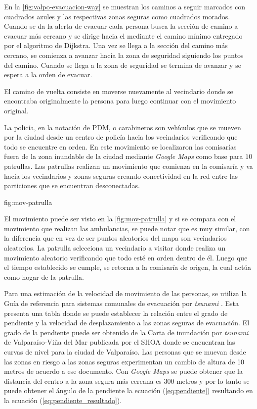 En la \ref{fig:valpo-evacuacion-way} se muestran los caminos a seguir marcados con
cuadrados azules y las respectivas zonas seguras como cuadrados morados. Cuando
se da la alerta de evacuar cada persona busca la sección de camino a evacuar más
cercano y se dirige hacia el mediante el camino mínimo entregado por el algoritmo de
Dijkstra. Una vez se llega a la sección del camino más cercano, se comienza a
avanzar hacia la zona de seguridad siguiendo los puntos del camino. Cuando se
llega a la zona de seguridad se termina de avanzar y se espera a la orden de
evacuar.

El camino de vuelta consiste en moverse nuevamente al vecindario donde se
encontraba originalmente la persona para luego continuar con el movimiento
original.





La policía, en la notación de PDM, o carabineros son vehículos que se mueven por
la ciudad desde un centro de policía hacia los vecindarios verificando que todo
se encuentre en orden. En este movimiento se localizaron las comisarías fuera de
la zona inundable de la ciudad mediante \textit{Google Maps} como base para 
$10$ patrullas. Las patrullas realizan un movimiento que comienza en la comisaría y va hacia
los vecindarios y zonas seguras creando conectividad en la red entre las
particiones que se encuentran desconectadas.




{}{fig:mov-patrulla}


El movimiento puede ser visto en la \ref{fig:mov-patrulla} y si se compara con
el movimiento que realizan las ambulancias, se puede notar que es muy similar,
con la diferencia que en vez de ser puntos aleatorios del mapa son vecindarios
aleatorios. La patrulla selecciona un vecindario a visitar donde realiza un
movimiento aleatorio verificando que todo esté en orden dentro de él. Luego que
el tiempo establecido se cumple, se retorna a la comisaría de origen, la cual
actúa como hogar de la patrulla.



Para una estimación de la velocidad de movimiento de las personas, se utiliza la
Guía de referencia para sistemas comunales de evacuación por \textit{tsunami}
\cite{guia_referencia_onemi}. Esta presenta una tabla donde se puede establecer la
relación entre el grado de pendiente y la velocidad de desplazamiento a las
zonas seguras de evacuación. El grado de la pendiente puede ser obtenido de la
Carta de inundación por \textit{tsunami} de Valparaíso-Viña del Mar
\cite{curvas_nivel} publicada por el SHOA donde se encuentran las curvas de nivel
para la ciudad de Valparaíso. Las personas que se muevan desde las zonas en
riesgo a las zonas seguras experimentan un cambio de altura de 10 metros de
acuerdo a ese documento. Con \textit{Google Maps} se puede obtener que la
distancia del centro a la zona segura más cercana es $300$ metros y por lo tanto
se puede obtener el ángulo de la pendiente la ecuación (\ref{eq:pendiente})
resultando en la ecuación (\ref{eq:pendiente_resultado}).

